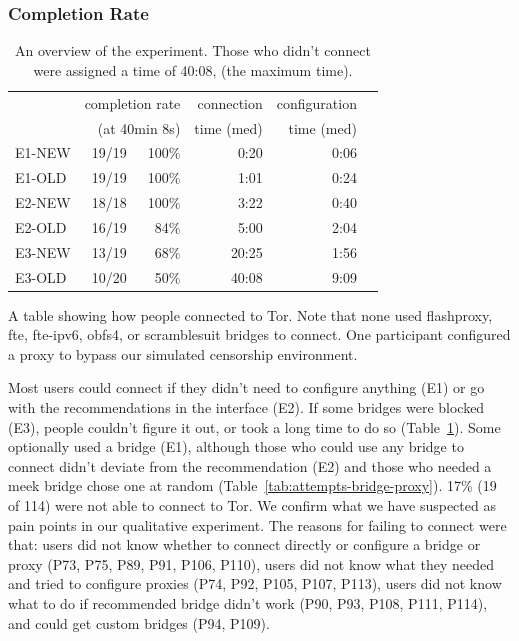 \documentclass[USenglish,oneside,twocolumn]{article}
\begin{document}
\subsubsection{Completion Rate} 

\begin{table}[t]
\centering
\begin{tabular}{l r r r r r}
& \multicolumn{2}{r}{completion rate} & \multicolumn{1}{r}{connection} & \multicolumn{1}{r}{configuration} \\
& \multicolumn{2}{r}{(at 40min 8s)} & \multicolumn{1}{r}{time (med)} & \multicolumn{1}{r}{time (med)} \\
\noalign{\hrule}
E1-NEW & 19/19 & 100\% & 0:20 & 0:06 \\
E1-OLD & 19/19 & 100\% & 1:01 & 0:24 \\
E2-NEW & 18/18 & 100\% & 3:22 & 0:40 \\
E2-OLD & 16/19 & 84\% & 5:00 & 2:04 \\
E3-NEW & 13/19 & 68\% & 20:25 & 1:56 \\
E3-OLD & 10/20 & 50\% & 40:08 & 9:09 \\
\end{tabular}
\caption{
An overview of the experiment. 
Those who didn't connect were assigned a time of 40:08, 
(the maximum time).
}
\label{table:participant-summary}
\end{table}

\begin{table}[t]
\centering

\caption{
A table showing how people connected to Tor.
Note that none used flashproxy, fte, fte-ipv6, obfs4, or scramblesuit bridges to connect. 
One participant configured a proxy to bypass our simulated censorship environment.
}
\label{tab:attempts-bridge-proxy}
\end{table} 

Most users could connect if they didn't need to configure anything (E1) or go with the recommendations in the interface (E2). If some bridges were blocked (E3), people couldn't figure it out, or took a long time to do so (Table~\ref{table:participant-summary}). Some optionally used a bridge (E1), although those who could use any bridge to connect didn't deviate from the recommendation (E2) and those who needed a meek bridge chose one at random (Table~\ref{tab:attempts-bridge-proxy}). 17\% (19 of 114) were not able to connect to Tor. We confirm what we have suspected as pain points in our qualitative experiment. The  reasons for failing to connect were that: users did not know whether to connect directly or configure a bridge or proxy  (P73, P75, P89, P91, P106, P110), users did not know what they needed and tried to configure proxies (P74, P92, P105, P107, P113), users did not know what to do if recommended bridge didn't work (P90, P93, P108, P111, P114), and could get custom bridges (P94, P109). 
\end{document}
